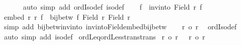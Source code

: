 \begin{isabellebody}
\ \ \isamarkupfalse%
\ {\isacharasterisk}{\kern0pt}\ \isamarkupfalse%
\ {\isacharparenleft}{\kern0pt}auto\ simp\ add{\isacharcolon}{\kern0pt}\ ordIso{\isacharunderscore}{\kern0pt}def\ iso{\isacharunderscore}{\kern0pt}def{\isacharparenright}{\kern0pt}\isanewline
\ \ \isamarkupfalse%
\ {\isacharquery}{\kern0pt}f{\isacharprime}{\kern0pt}\ {\isacharequal}{\kern0pt}\ {\isachardoublequoteopen}inv{\isacharunderscore}{\kern0pt}into\ {\isacharparenleft}{\kern0pt}Field\ r{\isacharparenright}{\kern0pt}\ f{\isachardoublequoteclose}\isanewline
\ \ \isamarkupfalse%
\ {\isachardoublequoteopen}embed\ r{\isacharprime}{\kern0pt}\ r\ {\isacharquery}{\kern0pt}f{\isacharprime}{\kern0pt}\ {\isasymand}\ bij{\isacharunderscore}{\kern0pt}betw\ {\isacharquery}{\kern0pt}f{\isacharprime}{\kern0pt}\ {\isacharparenleft}{\kern0pt}Field\ r{\isacharprime}{\kern0pt}{\isacharparenright}{\kern0pt}\ {\isacharparenleft}{\kern0pt}Field\ r{\isacharparenright}{\kern0pt}{\isachardoublequoteclose}\isanewline
\ \ \isamarkupfalse%
\ {}\ {}\ \isamarkupfalse%
\ {\isacharparenleft}{\kern0pt}simp\ add{\isacharcolon}{\kern0pt}\ bij{\isacharunderscore}{\kern0pt}betw{\isacharunderscore}{\kern0pt}inv{\isacharunderscore}{\kern0pt}into\ inv{\isacharunderscore}{\kern0pt}into{\isacharunderscore}{\kern0pt}Field{\isacharunderscore}{\kern0pt}embed{\isacharunderscore}{\kern0pt}bij{\isacharunderscore}{\kern0pt}betw{\isacharparenright}{\kern0pt}\isanewline
\ \ \isamarkupfalse%
\ {\isachardoublequoteopen}r{\isacharprime}{\kern0pt}\ {\isacharequal}{\kern0pt}o\ r{\isachardoublequoteclose}\ \isamarkupfalse%
\ ordIso{\isacharunderscore}{\kern0pt}def\ \isamarkupfalse%
\ {}\ \isamarkupfalse%
\ {\isacharparenleft}{\kern0pt}auto\ simp\ add{\isacharcolon}{\kern0pt}\ iso{\isacharunderscore}{\kern0pt}def{\isacharparenright}{\kern0pt}\isanewline
{}\isamarkupfalse%
%
\endisatagproof
{\isafoldproof}%
%
\isadelimproof
\isanewline
%
\endisadelimproof
\isanewline
{}\isamarkupfalse%
\ ordLeq{\isacharunderscore}{\kern0pt}ordLess{\isacharunderscore}{\kern0pt}trans{\isacharbrackleft}{\kern0pt}trans{\isacharbrackright}{\kern0pt}{\isacharcolon}{\kern0pt}\isanewline
{}\ {\isachardoublequoteopen}r\ {\isasymle}o\ r{\isacharprime}{\kern0pt}{\isachardoublequoteclose}\ \ {\isachardoublequoteopen}\ r{\isacharprime}{\kern0pt}\ {\isacharless}{\kern0pt}o\ r{\isacharprime}{\kern0pt}{\isacharprime}{\kern0pt}{\isachardoublequoteclose}\isanewline

\end{isabellebody}
